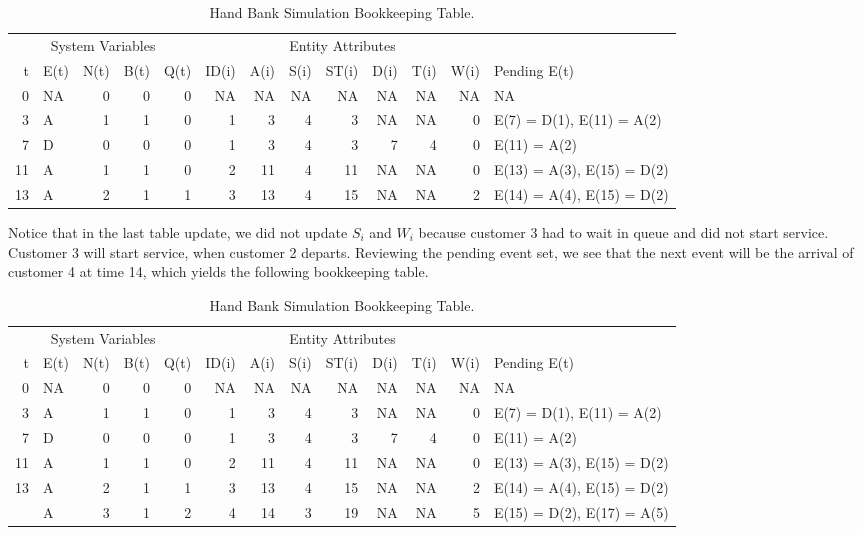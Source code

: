 \documentclass[
]{book}
\theoremstyle{definition}
\theoremstyle{definition}
\theoremstyle{definition}
\theoremstyle{definition}
\theoremstyle{remark}
\begin{document}
\begin{table}

\caption{\label{tab:SQBH5}Hand Bank Simulation Bookkeeping Table.}
\centering
\fontsize{10}{12}\selectfont
\begin{tabular}[t]{rlrrrrrrrrrrl}
\toprule
\multicolumn{5}{c}{System Variables} & \multicolumn{7}{c}{Entity Attributes} & \multicolumn{1}{c}{ } \\
\cmidrule(l{3pt}r{3pt}){1-5} \cmidrule(l{3pt}r{3pt}){6-12}
t & E(t) & N(t) & B(t) & Q(t) & ID(i) & A(i) & S(i) & ST(i) & D(i) & T(i) & W(i) & Pending E(t)\\
\midrule
0 & NA & 0 & 0 & 0 & NA & NA & NA & NA & NA & NA & NA & NA\\
3 & A & 1 & 1 & 0 & 1 & 3 & 4 & 3 & NA & NA & 0 & E(7) = D(1), E(11) = A(2)\\
7 & D & 0 & 0 & 0 & 1 & 3 & 4 & 3 & 7 & 4 & 0 & E(11) = A(2)\\
11 & A & 1 & 1 & 0 & 2 & 11 & 4 & 11 & NA & NA & 0 & E(13) = A(3), E(15) = D(2)\\
13 & A & 2 & 1 & 1 & 3 & 13 & 4 & 15 & NA & NA & 2 & E(14) = A(4), E(15) = D(2)\\
\bottomrule
\end{tabular}
\end{table}

Notice that in the last table update, we did not update \(S_{i}\) and
\(W_{i}\) because customer 3 had to wait in queue and did not start
service. Customer 3 will start service, when customer 2 departs.
Reviewing the pending event set, we see that the next event will be the
arrival of customer 4 at time 14, which yields the following bookkeeping
table.

\begin{table}

\caption{\label{tab:SQBH6}Hand Bank Simulation Bookkeeping Table.}
\centering
\fontsize{10}{12}\selectfont
\begin{tabular}[t]{rlrrrrrrrrrrl}
\toprule
\multicolumn{5}{c}{System Variables} & \multicolumn{7}{c}{Entity Attributes} & \multicolumn{1}{c}{ } \\
\cmidrule(l{3pt}r{3pt}){1-5} \cmidrule(l{3pt}r{3pt}){6-12}
t & E(t) & N(t) & B(t) & Q(t) & ID(i) & A(i) & S(i) & ST(i) & D(i) & T(i) & W(i) & Pending E(t)\\
\midrule
0 & NA & 0 & 0 & 0 & NA & NA & NA & NA & NA & NA & NA & NA\\
3 & A & 1 & 1 & 0 & 1 & 3 & 4 & 3 & NA & NA & 0 & E(7) = D(1), E(11) = A(2)\\
7 & D & 0 & 0 & 0 & 1 & 3 & 4 & 3 & 7 & 4 & 0 & E(11) = A(2)\\
11 & A & 1 & 1 & 0 & 2 & 11 & 4 & 11 & NA & NA & 0 & E(13) = A(3), E(15) = D(2)\\
13 & A & 2 & 1 & 1 & 3 & 13 & 4 & 15 & NA & NA & 2 & E(14) = A(4), E(15) = D(2)\\
\addlinespace
14 & A & 3 & 1 & 2 & 4 & 14 & 3 & 19 & NA & NA & 5 & E(15) = D(2), E(17) = A(5)\\
\bottomrule
\end{tabular}
\end{table}
\end{document}
